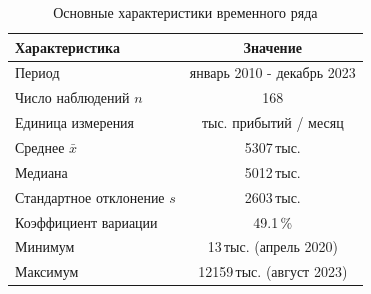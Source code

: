 \begin{table}[h!]
\centering
\caption{Основные характеристики временного ряда}
\label{tab:data_desc}
\begin{tabular}{lc}
\toprule
Характеристика & Значение \\
\midrule
Период & январь 2010 - декабрь 2023 \\
Число наблюдений $n$ & 168 \\
Единица измерения & тыс. прибытий / месяц \\
Среднее $\bar{x}$ & 5307\,тыс. \\
Медиана & 5012\,тыс. \\
Стандартное отклонение $s$ & 2603\,тыс. \\
Коэффициент вариации & 49.1\,\% \\
Минимум & 13\,тыс. (апрель 2020) \\
Максимум & 12159\,тыс. (август 2023) \\
\bottomrule
\end{tabular}
\end{table}
